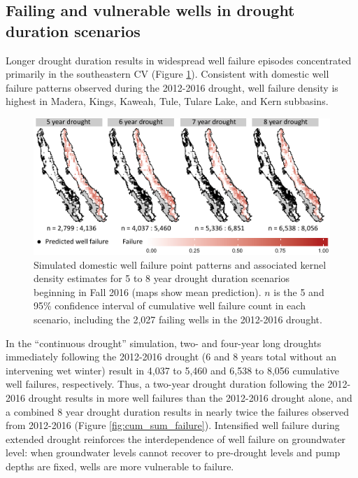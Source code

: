 \subsection{Failing and vulnerable wells in drought duration scenarios}

Longer drought duration results in widespread well failure episodes concentrated primarily in the southeastern CV (Figure \ref{fig:p_1_2_3_4}). Consistent with domestic well failure patterns observed during the 2012-2016 drought, well failure density is highest in Madera, Kings, Kaweah, Tule, Tulare Lake, and Kern subbasins.  

\begin{figure}%
	\includegraphics[width=\linewidth]{ch2_figs/fig_pred_1234_small_2.pdf}
	\caption{Simulated domestic well failure point patterns and associated kernel density estimates for 5 to 8 year drought duration scenarios beginning in Fall 2016 (maps show mean prediction). $n$ is the 5 and 95\% confidence interval of cumulative well failure count in each scenario, including the 2,027 failing wells in the 2012-2016 drought.}
	\label{fig:p_1_2_3_4}
\end{figure}

In the ``continuous drought'' simulation, two- and four-year long droughts immediately following the 2012-2016 drought (6 and 8 years total without an intervening wet winter) result in 4,037 to 5,460 and 6,538 to 8,056 cumulative well failures, respectively. Thus, a two-year drought duration following the 2012-2016 drought results in more well failures than the 2012-2016 drought alone, and a combined 8 year drought duration results in nearly twice the failures observed from 2012-2016 (Figure \ref{fig:cum_sum_failure}). Intensified well failure during extended drought reinforces the interdependence of well failure on groundwater level: when groundwater levels cannot recover to pre-drought levels and pump depths are fixed, wells are more vulnerable to failure.  


